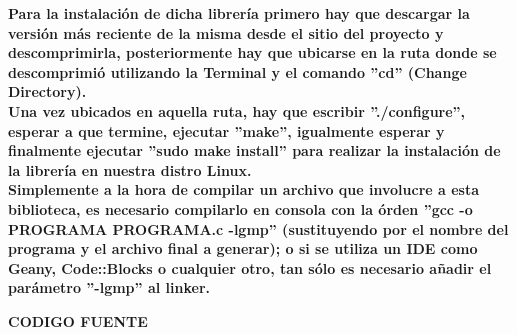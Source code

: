 \documentclass[letterpaper]{article}
\begin{document}
\begin{flushleft}
\textbf{\Large Para la instalaci\'on de dicha librer\'ia primero hay que descargar la versi\'on m\'as reciente de la misma desde el sitio del proyecto y descomprimirla, posteriormente hay que ubicarse en la ruta donde se descomprimi\'o utilizando la Terminal y el comando ''cd'' (Change Directory).\\}
\vspace{0.5cm}
\textbf{\Large Una vez ubicados en aquella ruta, hay que escribir ''./configure'', esperar a que termine, ejecutar ''make'', igualmente esperar y finalmente ejecutar ''sudo make install'' para realizar la instalaci\'on de la librer\'ia en nuestra distro Linux.\\}
\vspace{0.5cm}
\textbf{\Large Simplemente a la hora de compilar un archivo que involucre a esta biblioteca, es necesario compilarlo en consola con la \'orden ''gcc -o PROGRAMA PROGRAMA.c -lgmp'' (sustituyendo por el nombre del programa y el archivo final a generar); o si se utiliza un IDE como Geany, Code::Blocks o cualquier otro, tan s\'olo es necesario a\~nadir el par\'ametro ''-lgmp'' al linker.\\}
\end{flushleft}

\begin{center}
\vspace{-0.7cm}
\textbf{\LARGE CODIGO FUENTE\\}
\end{center}
\end{document}
